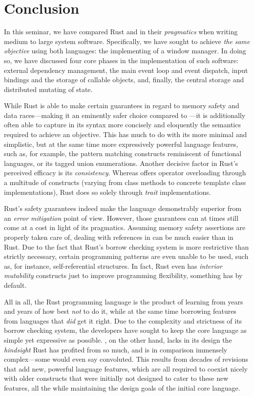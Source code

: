 \section{Conclusion}

In this seminar, we have compared Rust and \cpp in their \textit{pragmatics}
when writing medium to large system software. Specifically, we have sought to
achieve \textit{the same objective} using both languages: the implementing
of a window manager. In doing so, we have discussed four core phases in the
implementation of such software: external dependency management, the main event
loop and event dispatch, input bindings and the storage of callable objects,
and, finally, the central storage and distributed mutating of state.

While Rust is able to make certain guarantees in regard to memory safety and
data races---making it an eminently safer choice compared to \cpp---it is
additionally often able to capture in its syntax more concisely and eloquently
the semantics required to achieve an objective. This has much to do with its
more minimal and simplistic, but at the same time more expressively powerful
language features, such as, for example, the pattern matching constructs
reminiscent of functional languages, or its tagged union enumerations. Another
decisive factor in Rust's perceived efficacy is its \textit{consistency}.
Whereas \cpp offers operator overloading through a multitude of constructs
(varying from class methods to concrete template class implementations), Rust
does so solely through \textit{trait} implementations.

Rust's safety guarantees indeed make the language demonstrably superior from
an \textit{error mitigation} point of view. However, those guarantees can at
times still come at a cost in light of its pragmatics. Assuming memory safety
assertions are properly taken care of, dealing with references in \cpp can be
much easier than in Rust. Due to the fact that Rust's borrow checking system
is more restrictive than strictly necessary, certain programming patterns are
even unable to be used, such as, for instance, self-referential structures. In
fact, Rust even has \textit{interior mutability} constructs just to improve
programming flexibility, something \cpp has by default.

All in all, the Rust programming language is the product of learning from years
and years of how best \textit{not} to do it, while at the same time borrowing
features from languages that \textit{did} get it right. Due to the complexity
and strictness of its borrow checking system, the developers have sought to
keep the core language as simple yet expressive as possible. \cpp, on the other
hand, lacks in its design the \textit{hindsight} Rust has profited from so much,
and is in comparison immensely complex---some would even say convoluted. This
results from decades of revisions that add new, powerful language features,
which are all required to coexist nicely with older constructs that were
initially not designed to cater to these new features, all the while maintaining
the design goals of the initial core language.
